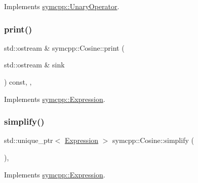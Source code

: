 Implements \mbox{\hyperlink{classsymcpp_1_1UnaryOperator_a85de3214870cd72edc63ac1c221ddeee}{symcpp\+::\+Unary\+Operator}}.

\mbox{\label{classsymcpp_1_1Cosine_a2d8d4dc8d5119d59365f212b7d855a53}} 
\subsubsection{\texorpdfstring{print()}{print()}}
{\footnotesize\ttfamily std\+::ostream \& symcpp\+::\+Cosine\+::print (\begin{DoxyParamCaption}\item[{std\+::ostream \&}]{sink }\end{DoxyParamCaption}) const\hspace{0.3cm}{\ttfamily [override]}, {\ttfamily [private]}, {\ttfamily [virtual]}}



Implements \mbox{\hyperlink{classsymcpp_1_1Expression_af37e13032a40f2da4d2866eaa8658049}{symcpp\+::\+Expression}}.

\mbox{\label{classsymcpp_1_1Cosine_a8bedd5e4ad3245d5ee6e6e7da3b5e8dc}} 
\subsubsection{\texorpdfstring{simplify()}{simplify()}}
{\footnotesize\ttfamily std\+::unique\+\_\+ptr$<$ \mbox{\hyperlink{classsymcpp_1_1Expression}{Expression}} $>$ symcpp\+::\+Cosine\+::simplify (\begin{DoxyParamCaption}{ }\end{DoxyParamCaption})\hspace{0.3cm}{\ttfamily [override]}, {\ttfamily [virtual]}}



Implements \mbox{\hyperlink{classsymcpp_1_1Expression_ab1fa6e55eea0682250d013f28db26cd2}{symcpp\+::\+Expression}}.

\mbox{\label{classsymcpp_1_1Cosine_ad3aa899567a080eeb41cb850de310178}} 
